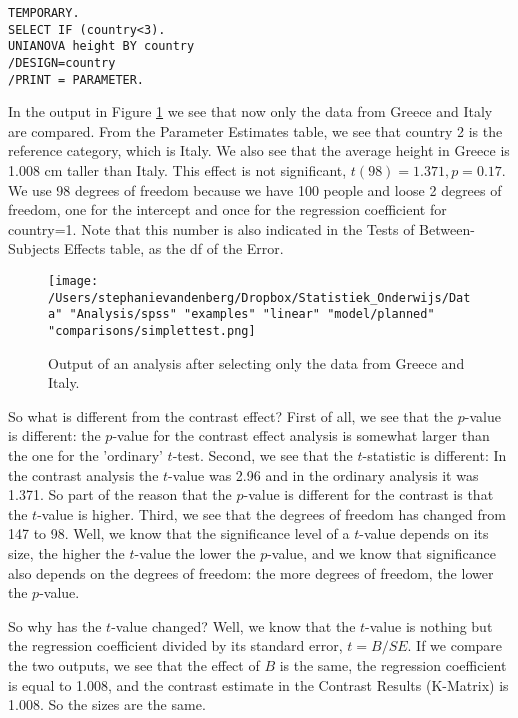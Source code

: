 \begin{verbatim}
TEMPORARY.
SELECT IF (country<3).
UNIANOVA height BY country
/DESIGN=country
/PRINT = PARAMETER.  
\end{verbatim}


In the output in Figure \ref{fig:simplettest} we see that now only the data from Greece and Italy are compared. From the Parameter Estimates table, we see that country 2 is the reference category, which is Italy. We also see that the average height in Greece is 1.008 cm taller than Italy. This effect is not significant, $t(98)=1.371,p=0.17$. We use 98 degrees of freedom because we have 100 people and loose 2 degrees of freedom, one for the intercept and once for the regression coefficient for country=1. Note that this number is also indicated in the Tests of Between-Subjects Effects table, as the df of the Error.

\begin{figure}[h]
    \begin{center}
       \texttt{[image: /Users/stephanievandenberg/Dropbox/Statistiek\_Onderwijs/Data" "Analysis/spss" "examples" "linear" "model/planned" "comparisons/simplettest.png]}
    \end{center}
    \label{fig:simplettest}
    \caption{Output of an analysis after selecting only the data from Greece and Italy.}
\end{figure}

 

So what is different from the contrast effect? First of all, we see that the $p$-value is different: the $p$-value for the contrast effect analysis is somewhat larger than the one for the 'ordinary' $t$-test. Second, we see that the $t$-statistic is different: In the contrast analysis the $t$-value was 2.96 and in the ordinary analysis it was 1.371. So part of the reason that the $p$-value is different for the contrast is that the $t$-value is higher. Third, we see that the degrees of freedom has changed from 147 to 98. Well, we know that the significance level of a $t$-value depends on its size, the higher the $t$-value the lower the $p$-value, and we know that significance also depends on the degrees of freedom: the more degrees of freedom, the lower the $p$-value. 

So why has the $t$-value changed? Well, we know that the $t$-value is nothing but the regression coefficient divided by its standard error, $t=B/{SE}$. If we compare the two outputs, we see that the effect of $B$ is the same, the regression coefficient is equal to 1.008, and the contrast estimate in the Contrast Results (K-Matrix) is 1.008. So the sizes are the same. 

